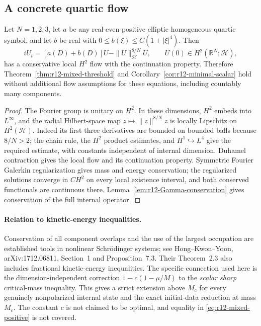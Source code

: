 \subsection{A concrete quartic flow}
\begin{proposition}
\label{prop:r12-quartic-vector-flow}
Let $N=1,2,3$, let $a$ be any real-even positive elliptic homogeneous
quartic symbol, and let $b$ be real with
$0\le b(\xi)\le C(1+|\xi|^4)$. Then
\[
 iU_t=[a(D)+b(D)]U-\|U\|_{\mathcal H}^{8/N}U,
 \qquad U(0)\in H^2(\mathbb R^N;\mathcal H),
\]
has a conservative local $H^2$ flow with the continuation property.
Therefore Theorem~\ref{thm:r12-mixed-threshold} and
Corollary~\ref{cor:r12-minimal-scalar} hold without additional flow
assumptions for these equations, including countably many components.
\end{proposition}
\begin{proof}
The Fourier group is unitary on $H^2$. In these dimensions,
$H^2$ embeds into $L^\infty$, and the radial Hilbert-space map
$z\mapsto\|z\|^{8/N}z$ is locally Lipschitz on $H^2(\mathcal H)$.
Indeed its first three derivatives are bounded on bounded balls
because $8/N>2$; the chain rule, the $H^2$ product estimates, and
$H^1\hookrightarrow L^4$ give the required estimate, with constants
independent of internal dimension. Duhamel contraction gives the
local flow and its continuation property. Symmetric Fourier
Galerkin regularization gives mass and energy conservation; the
regularized solutions converge in $C H^2$ on every local existence
interval, and both conserved functionals are continuous there.
Lemma~\ref{lem:r12-Gamma-conservation} gives conservation of the
full internal operator.
\end{proof}

\paragraph{Relation to kinetic-energy inequalities.}
Conservation of all component overlaps and the use of the largest
occupation are established tools in nonlinear Schr\"odinger systems;
see Hong--Kwon--Yoon, arXiv:1712.06811, Section~1 and
Proposition~7.3. Their Theorem~2.3 also includes fractional
kinetic-energy inequalities. The specific connection used here is
the dimension-independent correction $1-c(1-\mu/M)$ to the
\emph{scalar sharp} critical-mass inequality. This gives a strict
extension above $M_c$ for every genuinely nonpolarized internal
state and the exact initial-data reduction at mass $M_c$.
The constant $c$ is not claimed to be optimal, and equality in
\eqref{eq:r12-mixed-positive} is not covered.
